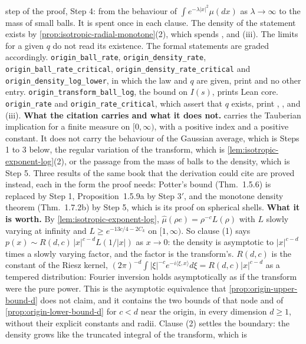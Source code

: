 \begin{proposition}
{step of the proof, Step 4: from the behaviour of $\int e^{-\lambda|x|^2}\mu(dx)$ as
$\lambda \to \infty$ to the mass of small balls. It is spent once in each clause. The density of
the statement exists by \ref{prop:isotropic-radial-monotone}(2), which spends ,
 and (iii). The limits for a given $q$ do not read its existence. The formal
statements are graded accordingly. \texttt{origin\_ball\_rate}, \texttt{origin\_density\_rate},
\texttt{origin\_ball\_rate\_critical}, \texttt{origin\_density\_rate\_critical} and
\texttt{origin\_density\_log\_lower}, in which the law and $q$ are given, print  and
no other entry. \texttt{origin\_transform\_ball\_log}, the bound on $I(s)$, prints Lean core.
\texttt{origin\_rate} and \texttt{origin\_rate\_critical}, which assert that $q$ exists, print
, ,  and (iii). \textbf{What the citation carries and
what it does not.}  carries the Tauberian implication for a finite measure on
$[0,\infty)$, with a positive index and a positive constant. It does not carry the behaviour of
the Gaussian average, which is Steps 1 to 3 below, the regular variation of the transform, which
is \ref{lem:isotropic-exponent-log}(2), or the passage from the mass of balls to the density,
which is Step 5. Three results of the same book that the derivation could cite are proved
instead, each in the form the proof needs: Potter's bound (Thm.~1.5.6) is replaced by Step 1,
Proposition~1.5.9a by Step 3$'$, and the monotone density theorem (Thm.~1.7.2b) by Step 5, which
is its proof on spherical shells. \textbf{What it is worth.} By
\ref{lem:isotropic-exponent-log}, $\widehat\mu(\rho e) = \rho^{-c}L(\rho)$ with $L$ slowly varying
at infinity and $L \ge e^{-13c/4 - 2C_k}$ on $[1,\infty)$. So clause (1) says
$p(x) \sim R(d,c)\,|x|^{c-d}L(1/|x|)$ as $x \to 0$: the density is asymptotic to $|x|^{c-d}$ times
a slowly varying factor, and the factor is the transform's. $R(d,c)$ is the constant of the Riesz
kernel, $(2\pi)^{-d}\int|\xi|^{-c}e^{-i\langle\xi,x\rangle}d\xi = R(d,c)|x|^{c-d}$ as a tempered
distribution: Fourier inversion holds asymptotically as if the transform were the pure power.
This is the asymptotic equivalence that \ref{prop:origin-upper-bound-d} does not claim, and it
contains the two bounds of that node and of \ref{prop:origin-lower-bound-d} for $c < d$ near the
origin, in every dimension $d \ge 1$, without their explicit constants and radii. Clause (2)
settles the boundary: the density grows like the truncated integral of the transform, which is
}
\end{proposition}
